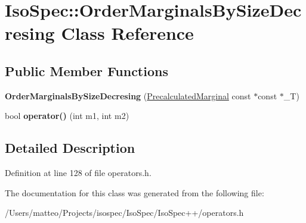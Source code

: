 \hypertarget{class_iso_spec_1_1_order_marginals_by_size_decresing}{}\section{Iso\+Spec\+:\+:Order\+Marginals\+By\+Size\+Decresing Class Reference}
\label{class_iso_spec_1_1_order_marginals_by_size_decresing}
\subsection*{Public Member Functions}
\begin{DoxyCompactItemize}
\item 
\mbox{\label{class_iso_spec_1_1_order_marginals_by_size_decresing_a2530a398df14766242b936e5c83e0f37}} 
{\bfseries Order\+Marginals\+By\+Size\+Decresing} (\mbox{\hyperlink{class_iso_spec_1_1_precalculated_marginal}{Precalculated\+Marginal}} const $\ast$const $\ast$\+\_\+T)
\item 
\mbox{\label{class_iso_spec_1_1_order_marginals_by_size_decresing_a43312dd35580f579c9e64b32e06edb63}} 
bool {\bfseries operator()} (int m1, int m2)
\end{DoxyCompactItemize}


\subsection{Detailed Description}


Definition at line 128 of file operators.\+h.



The documentation for this class was generated from the following file\+:\begin{DoxyCompactItemize}
\item 
/\+Users/matteo/\+Projects/isospec/\+Iso\+Spec/\+Iso\+Spec++/operators.\+h\end{DoxyCompactItemize}
